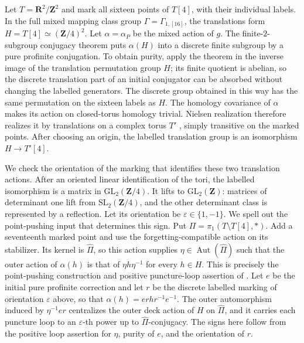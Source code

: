 Let \(T=\mathbf R^2/\mathbf Z^2\) and mark all sixteen points
of \(T[4]\), with their individual labels. In the full mixed
mapping class group \(\Gamma=\Gamma_{1,[16]}\), the translations
form \(H=T[4]\simeq(\mathbf Z/4)^2\).
Let \(\alpha=\alpha_P\) be the mixed action of \(g\).
The finite-\(2\)-subgroup conjugacy theorem
\cite[Theorem~A(i); Theorem~6.2(i)]{CubicBZ}
puts \(\alpha(H)\) into a discrete finite subgroup by a pure
profinite conjugation. To obtain purity, apply the theorem
in the inverse image of the translation permutation group
\(H\); its finite quotient is abelian, so the discrete
translation part of an initial conjugator can be absorbed
without changing the labelled generators. The discrete group obtained in this
way has the same permutation on the sixteen labels as \(H\).
The homology covariance of \(\alpha\) makes its action on
closed-torus homology trivial. Nielsen realization therefore
realizes it by translations on a complex torus \(T'\)
\cite[Section~4]{CubicKerckhoff}, simply
transitive on the marked points. After choosing an origin,
the labelled translation group is an isomorphism
\(H\to T'[4]\).

We check the orientation of the marking that identifies these
two translation actions. After an oriented linear identification
of the tori, the labelled isomorphism is a matrix in
\(\mathrm{GL}_2(\mathbf Z/4)\). It lifts to
\(\mathrm{GL}_2(\mathbf Z)\): matrices of determinant one lift
from \(\mathrm{SL}_2(\mathbf Z/4)\), and the other determinant
class is represented by a reflection. Let its orientation
be \(\varepsilon\in\{1,-1\}\).
We spell out the point-pushing input that determines this sign.
Put \(\Pi=\pi_1(T\setminus T[4],*)\). Add a seventeenth marked
point and use the forgetting-compatible action on its stabilizer.
Its kernel is \(\widehat\Pi\), so this action supplies
\(\eta\in\operatorname{Aut}(\widehat\Pi)\) such that the
outer action of \(\alpha(h)\) is that of
\(\eta h\eta^{-1}\) for every \(h\in H\).
This is precisely the point-pushing construction and positive
puncture-loop assertion of \cite[Lemma~16(b),(c)]{H17}.
Let \(e\) be the initial pure profinite correction and let
\(r\) be the discrete labelled marking of orientation
\(\varepsilon\) above, so that
\(\alpha(h)=erhr^{-1}e^{-1}\).
The outer automorphism induced by \(\eta^{-1}er\) centralizes
the outer deck action of \(H\) on \(\widehat\Pi\), and it
carries each puncture loop to an \(\varepsilon\)-th power
up to \(\widehat\Pi\)-conjugacy. The signs here follow from
the positive loop assertion for \(\eta\), purity of \(e\),
and the orientation of \(r\).

